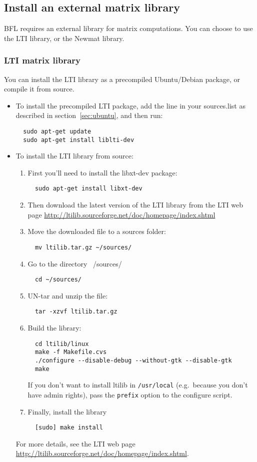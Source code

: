 \documentclass[a4paper,10pt]{article}
\begin{document}
\subsection{Install an external matrix library}
BFL requires an external library for matrix computations. You can
choose to use the LTI library, or the Newmat library.

\subsubsection{LTI matrix library}
\label{subsec:lti}
You can install the LTI library as a precompiled Ubuntu/Debian
package, or compile it from source. 
\begin{itemize}
\item To install the precompiled LTI package, add the line in your
  sources.list as described in section~\ref{sec:ubuntu}, and then run:
\begin{verbatim}
  sudo apt-get update
  sudo apt-get install liblti-dev
\end{verbatim}
\item To install the LTI library from source:

\begin{enumerate}
\item First you'll need to install the libxt-dev package:
\begin{verbatim}
  sudo apt-get install libxt-dev
\end{verbatim}
\item Then download the latest version of the LTI library from the LTI
  web page
  \url{http://ltilib.sourceforge.net/doc/homepage/index.shtml}
\item Move the downloaded file to a sources folder:
\begin{verbatim}
  mv ltilib.tar.gz ~/sources/
\end{verbatim}
\item Go to the directory ~/sources/
\begin{verbatim}
  cd ~/sources/
\end{verbatim}
\item UN-tar and unzip the file:
\begin{verbatim}
  tar -xzvf ltilib.tar.gz
\end{verbatim}
\item Build the library:
\begin{verbatim}
  cd ltilib/linux
  make -f Makefile.cvs
  ./configure --disable-debug --without-gtk --disable-gtk
  make
\end{verbatim}
  If you don't want to install ltilib in \texttt{/usr/local}
  (e.g.~because you don't have admin rights), pass the
  \texttt{\-\-prefix} option to the configure script.
\item Finally, install the library
\begin{verbatim}
  [sudo] make install
\end{verbatim}
\end{enumerate}
For more details, see the LTI web page
\url{http://ltilib.sourceforge.net/doc/homepage/index.shtml}.
\end{itemize}
\end{document}
